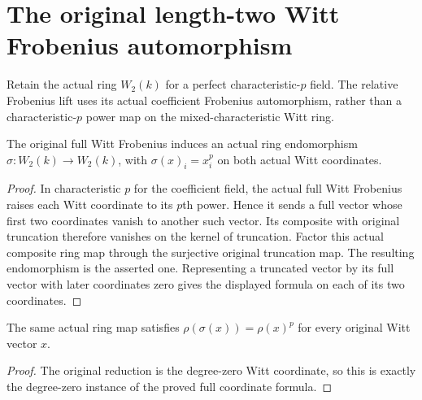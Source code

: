 \section{The original length-two Witt Frobenius automorphism}
\label{sec:witt-two-frobenius}

Retain the actual ring $W_2(k)$ for a perfect
characteristic-$p$ field. The relative Frobenius
lift uses its actual coefficient Frobenius
automorphism, rather than a characteristic-$p$
power map on the mixed-characteristic Witt ring.

\begin{definition}
\label{def:witt-two-frobenius}
\leanok
{}
The original full Witt Frobenius induces an actual
ring endomorphism $\sigma:W_2(k)\to W_2(k)$,
with $\sigma(x)_i=x_i^p$ on both actual Witt
coordinates.
\end{definition}
\begin{proof}
In characteristic $p$ for the coefficient field,
the actual full Witt Frobenius raises each Witt
coordinate to its $p$th power. Hence it sends a
full vector whose first two coordinates vanish to
another such vector. Its composite with original
truncation therefore vanishes on the kernel of
truncation. Factor this actual composite ring map
through the surjective original truncation map.
The resulting endomorphism is the asserted one.
Representing a truncated vector by its full vector
with later coordinates zero gives the displayed
formula on each of its two coordinates.
\end{proof}

\begin{lemma}
\label{lem:witt-two-frobenius-reduction}
\leanok
{}
The same actual ring map satisfies
$\rho(\sigma(x))=\rho(x)^p$ for every original
Witt vector $x$.
\end{lemma}
\begin{proof}
The original reduction is the degree-zero Witt
coordinate, so this is exactly the degree-zero
instance of the proved full coordinate formula.
\end{proof}

